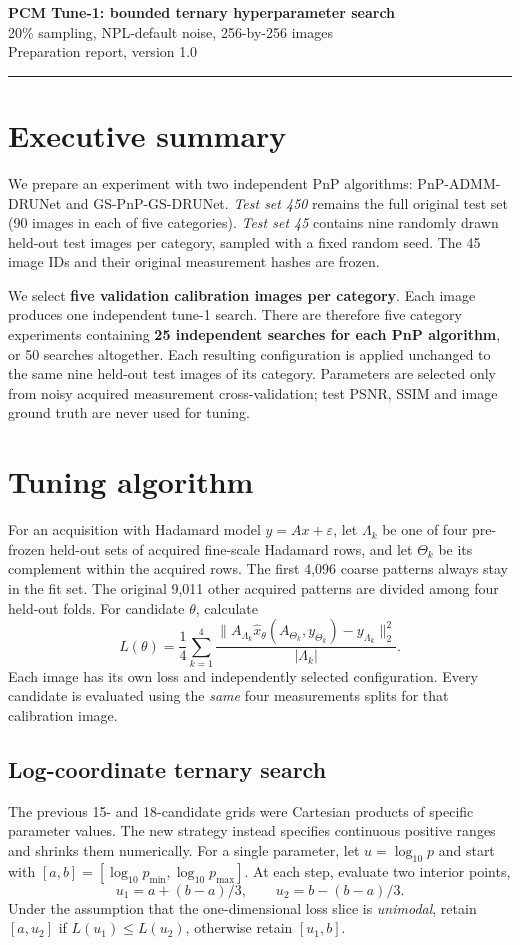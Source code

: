 \documentclass[10pt,a4paper]{article}
\begin{document}
{\LARGE\bfseries PCM Tune-1: bounded ternary hyperparameter search}\\[5pt]
{\large 20\% sampling, NPL-default noise, 256-by-256 images}\\[4pt]
{\small Preparation report, version 1.0}\\[4pt]

\par\medskip\hrule

\section{Executive summary}
We prepare an experiment with two independent PnP algorithms:
PnP-ADMM-DRUNet and GS-PnP-GS-DRUNet.
\emph{Test set 450} remains the full original test set
(90 images in each of five categories).
\emph{Test set 45} contains nine randomly drawn held-out test
images per category, sampled with a fixed random seed.
The 45 image IDs and their original measurement hashes are frozen.

We select \textbf{five validation calibration images per category}.
Each image produces one independent tune-1 search.
There are therefore five category experiments containing
\textbf{25 independent searches for each PnP algorithm}, or
50 searches altogether. Each resulting configuration is applied
unchanged to the same nine held-out test images of its category.
Parameters are selected only from noisy acquired measurement
cross-validation; test PSNR, SSIM and image ground truth are
never used for tuning.

\section{Tuning algorithm}
For an acquisition with Hadamard model $y=Ax+\varepsilon$,
let $\Lambda_k$ be one of four pre-frozen held-out sets of acquired
fine-scale Hadamard rows, and let $\Theta_k$ be its complement
within the acquired rows. The first 4,096 coarse patterns always
stay in the fit set. The original 9,011 other acquired patterns
are divided among four held-out folds.
For candidate $\theta$, calculate
\[
L(\theta)=\frac14\sum_{k=1}^4
\frac{\|A_{\Lambda_k}\widehat x_\theta(A_{\Theta_k},y_{\Theta_k})
-y_{\Lambda_k}\|_2^2}{|\Lambda_k|}.
\]
Each image has its own loss and independently selected
configuration. Every candidate is evaluated using the \emph{same}
four measurements splits for that calibration image.

\subsection*{Log-coordinate ternary search}
The previous 15- and 18-candidate grids were Cartesian products of
specific parameter values. The new strategy instead specifies
continuous positive ranges and shrinks them numerically.
For a single parameter, let $u=\log_{10}p$ and start with
$[a,b]=[\log_{10}p_{\min},\log_{10}p_{\max}]$.
At each step, evaluate two interior points,
\[
u_1=a+(b-a)/3,\qquad u_2=b-(b-a)/3.
\]
Under the assumption that the one-dimensional loss slice
is \emph{unimodal}, retain $[a,u_2]$ if
$L(u_1)\le L(u_2)$, otherwise retain $[u_1,b]$.
\end{document}
